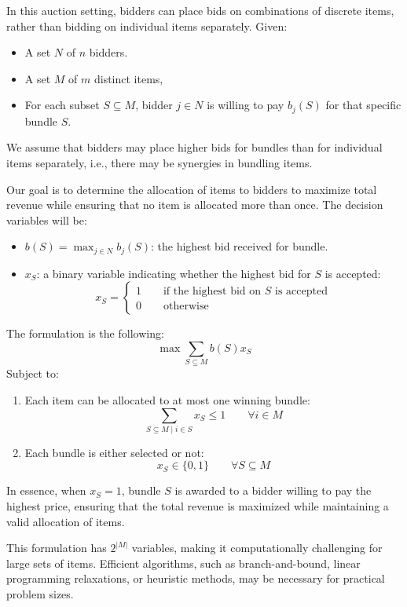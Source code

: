 \begin{example}
    In this auction setting, bidders can place bids on combinations of discrete items, rather than bidding on individual items separately.
    Given:
    \begin{itemize}
        \item A set $N$ of $n$ bidders.
        \item A set $M$ of $m$ distinct items,
        \item For each subset $S \subseteq M$, bidder $j \in N$ is willing to pay $b_j(S)$ for that specific bundle $S$.
    \end{itemize}
    We assume that bidders may place higher bids for bundles than for individual items separately, i.e., there may be synergies in bundling items.

    Our goal is to determine the allocation of items to bidders to maximize total revenue while ensuring that no item is allocated more than once.
    The decision variables will be: 
    \begin{itemize}
        \item $b(S) = \max_{j\in N} b_j(S)$: the highest bid received for bundle.
        \item $x_S$: a binary variable indicating whether the highest bid for $S$ is accepted: 
            \[x_S=\begin{cases} 1 \qquad\text{if the highest bid on }S\text{ is accepted} \\ 0 \qquad \text{otherwise} \end{cases}\]
    \end{itemize}

    The formulation is the following: 
    \[\max\sum_{S\subseteq M}b(S)x_S\]
    Subject to: 
    \begin{enumerate}
        \item Each item can be allocated to at most one winning bundle: 
            \[\sum_{S\subseteq M\mid i\in S}x_S\leq 1\qquad \forall i \in M\]
        \item Each bundle is either selected or not: 
            \[x_S\in\{0,1\}\qquad\forall S \subseteq M\]
    \end{enumerate}
    In essence, when $x_S = 1$, bundle $S$ is awarded to a bidder willing to pay the highest price, ensuring that the total revenue is maximized while maintaining a valid allocation of items.

    This formulation has $2^{\left\lvert M \right\rvert}$ variables, making it computationally challenging for large sets of items.
    Efficient algorithms, such as branch-and-bound, linear programming relaxations, or heuristic methods, may be necessary for practical problem sizes.
\end{example}